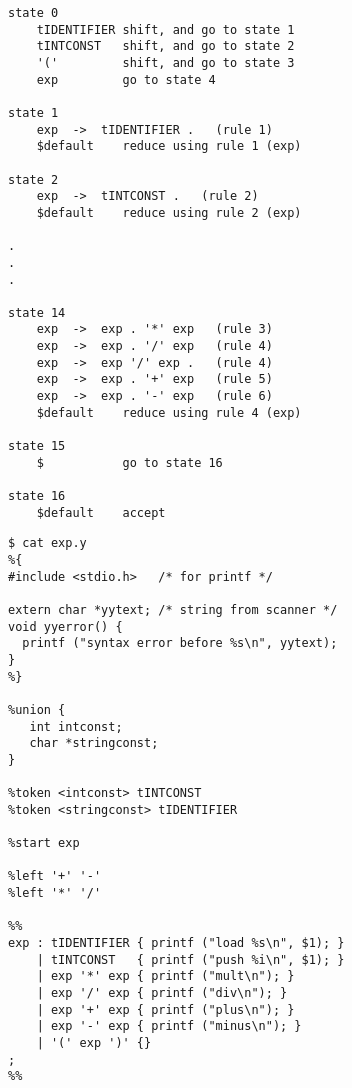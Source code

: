 \begin{slide*}
\begin{scriptsize}
\begin{verbatim}
state 0
    tIDENTIFIER shift, and go to state 1
    tINTCONST   shift, and go to state 2
    '('         shift, and go to state 3
    exp         go to state 4

state 1
    exp  ->  tIDENTIFIER .   (rule 1)
    $default    reduce using rule 1 (exp)

state 2
    exp  ->  tINTCONST .   (rule 2)
    $default    reduce using rule 2 (exp)

.
.
.

state 14
    exp  ->  exp . '*' exp   (rule 3)
    exp  ->  exp . '/' exp   (rule 4)
    exp  ->  exp '/' exp .   (rule 4)
    exp  ->  exp . '+' exp   (rule 5)
    exp  ->  exp . '-' exp   (rule 6)
    $default    reduce using rule 4 (exp)
 
state 15
    $           go to state 16
 
state 16
    $default    accept
\end{verbatim}
\end{scriptsize}
\vfil
\end{slide*}

\begin{slide*}
\begin{scriptsize}
\begin{verbatim}
$ cat exp.y
%{
#include <stdio.h>   /* for printf */

extern char *yytext; /* string from scanner */
void yyerror() {
  printf ("syntax error before %s\n", yytext); 
}
%}
 
%union {
   int intconst;
   char *stringconst;
}
 
%token <intconst> tINTCONST
%token <stringconst> tIDENTIFIER 
 
%start exp
 
%left '+' '-'
%left '*' '/'
 
%% 
exp : tIDENTIFIER { printf ("load %s\n", $1); }
    | tINTCONST   { printf ("push %i\n", $1); }
    | exp '*' exp { printf ("mult\n"); }
    | exp '/' exp { printf ("div\n"); }
    | exp '+' exp { printf ("plus\n"); }
    | exp '-' exp { printf ("minus\n"); }
    | '(' exp ')' {}
;
%%
\end{verbatim}
\end{scriptsize}
\vfil
\end{slide*}

